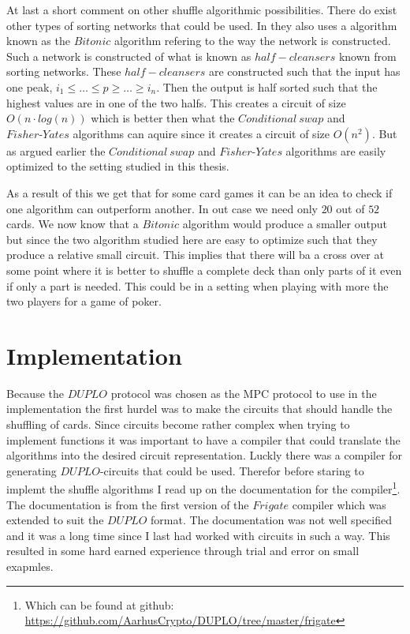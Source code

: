 At last a short comment on other shuffle algorithmic possibilities. There do exist other types of sorting networks that could be used. In  they also uses a algorithm known as the $Bitonic$ algorithm refering to the way the network is constructed. Such a network is constructed of what is known as $half-cleansers$ known from sorting networks. These $half-cleansers$ are constructed such that the input has one peak, $i_1\leq \dots \leq p \geq \dots \geq i_n$. Then the output is half sorted such that the highest values are in one of the two halfs. This creates a circuit of size $O(n\cdot log(n))$ which is better then what the $Conditional~swap$ and $Fisher\text{-}Yates$ algorithms can aquire since it creates a circuit of size $O(n^2)$. But as argued earlier the $Conditional~swap$ and $Fisher\text{-}Yates$ algorithms are easily optimized to the setting studied in this thesis.


As a result of this we get that for some card games it can be an idea to check if one algorithm can outperform another. In out case we need only $20$ out of $52$ cards. We now know that a $Bitonic$ algorithm would produce a smaller output but since the two algorithm studied here are easy to optimize such that they produce a relative small circuit. This implies that there will ba a cross over at some point where it is better to shuffle a complete deck than only parts of it even if only a part is needed. This could be in a setting when playing with more the two players for a game of poker.

\section{Implementation}


Because the $DUPLO$ protocol was chosen as the MPC protocol to use in the implementation the first hurdel was to make the circuits that should handle the shuffling of cards. Since circuits become rather complex when trying to implement functions it was important to have a compiler that could translate the algorithms into the desired circuit representation. Luckly there was a compiler for generating $DUPLO$-circuits that could be used. Therefor before staring to implemt the shuffle algorithms I read up on the documentation for the compiler\footnote{Which can be found at github: \url{https://github.com/AarhusCrypto/DUPLO/tree/master/frigate}}. The documentation is from the first version of the $Frigate$ compiler which was extended to suit the $DUPLO$ format. The documentation was not well specified and it was a long time since I last had worked with circuits in such a way. This resulted in some hard earned experience through trial and error on small exapmles.

